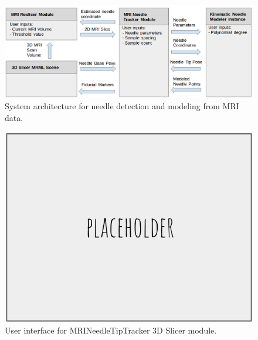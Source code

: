 \begin{figure}[h]
\includegraphics[width=1.0\textwidth]{Fig/chap5/MRI_software_architecture.png}
\caption{System architecture for needle detection and modeling from MRI data.}
\label{fig:MRI_architecture}
\end{figure}

\begin{figure}[h]
\includegraphics[width=1.0\textwidth]{Fig/placeholder.png}
\caption{User interface for MRINeedleTipTracker 3D Slicer module.}
\label{fig:slicer_gui}
\end{figure}


